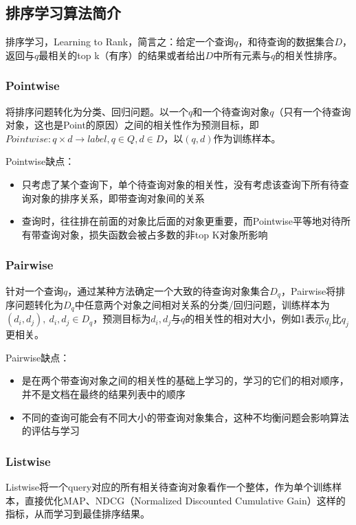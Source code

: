\subsection{排序学习算法简介}
排序学习，Learning to Rank，简言之：给定一个查询$q$，和待查询的数据集合$D$，返回与$q$最相关的top k（有序）的结果或者给出$D$中所有元素与$q$的相关性排序。

\subsubsection{Pointwise}
将排序问题转化为分类、回归问题。以一个$q$和一个待查询对象$q$（只有一个待查询对象，这也是Point的原因）之间的相关性作为预测目标，即$Pointwise: q \times d \rightarrow label, q \in Q, d \in D$，以$(q, d)$作为训练样本。

Pointwise缺点：
\begin{itemize}
	\item 只考虑了某个查询下，单个待查询对象的相关性，没有考虑该查询下所有待查询对象的排序关系，即带查询对象间的关系
	\item 查询时，往往排在前面的对象比后面的对象更重要，而Pointwise平等地对待所有带查询对象，损失函数会被占多数的非top K对象所影响
\end{itemize}


\subsubsection{Pairwise}
针对一个查询$q$，通过某种方法确定一个大致的待查询对象集合$D_q$，Pairwise将排序问题转化为$D_q$中任意两个对象之间相对关系的分类/回归问题，训练样本为$(d_i, d_j),\: d_i, d_j \in D_q$，预测目标为$d_i, d_j$与$q$的相关性的相对大小，例如1表示$q_i$比$q_j$更相关。

Pairwise缺点：
\begin{itemize}
	\item 是在两个带查询对象之间的相关性的基础上学习的，学习的它们的相对顺序，并不是文档在最终的结果列表中的顺序
	\item 不同的查询可能会有不同大小的带查询对象集合，这种不均衡问题会影响算法的评估与学习
\end{itemize}


\subsubsection{Listwise}
Listwise将一个query对应的所有相关待查询对象看作一个整体，作为单个训练样本，直接优化MAP、NDCG（Normalized Discounted Cumulative Gain）这样的指标，从而学习到最佳排序结果。
